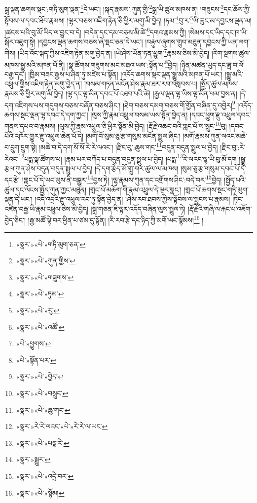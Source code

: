 སྒྲ་ལྡན་ཆགས་སྡང་:གཏི་མུག་ལྡན་\footnote{«སྣར་»«པེ་»གཏི་མུག་ཅན་}དེ་ཡང་། །སྐད་རྣམས་:ཀུན་གྱི་\footnote{«སྣར་»«པེ་»ཀུན་གྱིས་}སྒྲ་ཡི་ཚུལ་མཁས་ན། །གཟུངས་\footnote{«སྣར་»«པེ་»གཟུགས་}དང་ཆོས་ཀྱི་སྟོབས་ལ་དབང་ཐོབ་རྣམས། །ལྷར་བཅས་འཇིག་རྟེན་ཅི་ཕྱིར་མགུ་མི་བྱེད། །ཏམ་\footnote{«སྣར་»«པེ་»ཏུམ་}བུ་ར་\footnote{«སྣར་»«པེ་»རུ་}ཡི་ཆུང་མ་དབྱངས་ལྡན་མ། །ཚངས་པའི་བུ་མོ་ཡིད་ལ་བྱུང་བ་དེ། །བདེན་དང་དམ་བཅས་མི་ཚེ་\footnote{«སྣར་»«པེ་»འཚོ་}དགའ་རྣམས་ཀྱི། །སེམས་དང་ཡིད་དང་ཁ་ཡི་སྒོར་འཇུག་སྟེ། །དབྱངས་ལྡན་ཆགས་བཅས་ཞེ་སྡང་ཅན་དེ་ཡང་། །བརྟུལ་ཞུགས་གྲུབ་མཐུན་དབྱངས་ཀྱི་ཡན་ལག་གིས། །ཡིད་འོང་སྐད་ཀྱིས་འཇིག་རྟེན་མགུ་བྱེད་ན། །ཡེ་ཤེས་ཡོན་ཏན་ཕྱུག་\footnote{«པེ་»ཕྱུགས་}རྣམས་ཅིས་མི་བྱེད། །རིག་སྔགས་ཚུལ་མཁས་སྒྱུ་མའི་མཁན་པོ་ནི། །སྣ་ཚོགས་གཟུགས་མང་མཐའ་ཡས་:སྟོན་པ་\footnote{«པེ་»སྟོན་པར་}བྱེད། །ཉིན་མཚན་ཡུད་དང་ཟླ་བ་ལོ་བརྒྱ་དང་། །ཁྱིམ་བཟང་རྒྱས་པ་ཤིན་ཏུ་མཛེས་པ་སྟོན། །འདོད་ཆགས་སྡང་ལྡན་སྒྱུ་མའི་མཁན་པོ་ཡང་། །སྒྱུ་མའི་འཕྲུལ་གྱིས་འཇིག་རྟེན་མགུ་བྱེད་ན། །བསམ་གཏན་མངོན་ཤེས་རྣམ་ཐར་རབ་བསླབས་པ། །སྤྱོད་ཚུལ་མཁས་རྣམས་ཅི་ཕྱིར་མགུ་མི་བྱེད། །ལྷ་དང་ལྷ་མིན་དབང་པོ་འཐབ་པའི་ཚེ། །རྒྱལ་ལྡན་ལྷ་ཡིས་ལྷ་མིན་ཕམ་བྱས་ན། །དེ་དག་འཇིགས་པས་གདུགས་བཅས་བཞོན་བཅས་ཤིང་། །ཐེག་བཅས་དམག་བཅས་གོ་གྱོན་བཞིན་དུ་འབྱེར།\footnote{«སྣར་»«པེ་»བྱེད།} །འདོད་ཆགས་སྡང་ལྡན་ལྷ་དབང་དེ་དག་ཀྱང་། །ལུས་ཀྱི་རྣམ་འཕྲུལ་བསམ་ཡས་སྟོན་བྱེད་ན། །དབང་ཕྱུག་རྫུ་འཕྲུལ་དབང་གནས་དཔའ་བ་རྣམས། །ལུས་ཀྱི་རྣམ་འཕྲུལ་ཅི་ཕྱིར་སྟོན་མི་བྱེད། །རྡོ་རྗེ་འཆང་བའི་གླང་པོ་ས་སྲུང་\footnote{«སྣར་»«པེ་»བསྲུང་}བུ། །དབང་པོའི་འཁོར་གྱུར་རྫུ་འཕྲུལ་ཆེན་པོ་དེ། །མགོ་བོ་སུམ་ཅུ་རྩ་གསུམ་མངོན་སྤྲུལ་ཞིང་། །མགོ་རྣམས་ཀུན་ལའང་མཆེ་བ་དྲུག་དྲུག་སྟེ། །མཆེ་བ་དེ་དག་སོ་སོ་རེ་རེ་ལའང་། །རྫིང་བུ་:ཆུས་གང་\footnote{«སྣར་»«པེ་»ཆུ་གང་}བདུན་བདུན་སྤྲུལ་པ་བྱེད། །རྫིང་བུ་:རེ་རེའང་\footnote{«སྣར་»རེ་རེ་ལའང་«པེ་»རེ་རེ་ལ་ཡང་}པདྨ་སྣ་ཚོགས་པ། །རྣམ་པར་བཀོད་པ་བདུན་བདུན་སྤྲུལ་པ་བྱེད། །པདྨ་\footnote{«སྣར་»«པེ་»པདྨ་རེ་}རེ་ལའང་ལྷ་ཡི་བུ་མོ་དག །སྒྱུ་རྩལ་ཀུན་ཤེས་བདུན་བདུན་སྤྲུལ་པ་བྱེད། །དེ་དག་རྩེད་མོ་གླུ་གར་ཚུལ་ལ་མཁས། །སུམ་ཅུ་རྩ་གསུམ་དབང་པོ་དེ་དང་རྩེ། །གླང་པོ་དེ་ཡང་ལུས་ནི་བསྒྱུར་\footnote{«སྣར་»སྒྱུར་}བྱས་ཏེ། །ལྷ་རྣམས་ཀུན་དང་འགྲོགས་ཤིང་:བདེ་བར་\footnote{«སྣར་»«པེ་»འདྲེ་བར་}བྱེད། །སྤྱོད་པའི་ཚུལ་དང་ལོངས་སྤྱོད་ཀུན་ཀྱང་མཐུན། །གླང་པོ་མཆོག་གི་རྣམ་འཕྲུལ་དེ་ལྟར་སྣང་། །གླང་པོ་ཆགས་སྡང་གཏི་མུག་ལྡན་དེ་ཡང་། །འདི་འདྲའི་རྫུ་འཕྲུལ་རབ་ཏུ་སྟོན་བྱེད་ན། །ཤེས་རབ་ཐབས་ཀྱིས་སྟོབས་ལ་སྦྱངས་པ་རྣམས། །ཏིང་འཛིན་བརྒྱ་ཡི་རྣམ་འཕྲུལ་ཅིས་མི་བྱེད། །སྒྲ་གཅན་ཇི་ལྟར་འདོད་བཞིན་ལུས་སྤྲུལ་ཏེ། །རྡོ་རྗེའི་གཞི་ལ་རྐང་པ་འཇོག་བྱེད་ཅིང་། །རྒྱ་མཚོ་ལྟེ་བར་ཕྱིན་པ་ཙམ་དུ་སྟོན། །རི་རབ་རྩེ་དང་ཉིད་ཀྱི་མགོ་ཡང་སྙོམས།\footnote{«སྣར་»«པེ་»སྙོམ།} །
